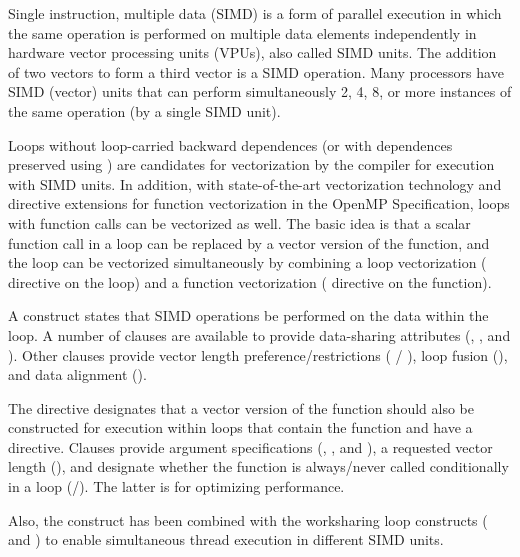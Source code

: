 \label{chap:simd}

Single instruction, multiple data (SIMD) is a form of parallel execution 
in which the same operation is performed on multiple data elements 
independently in hardware vector processing units (VPUs), also called SIMD units.
The addition of two vectors to form a third vector is a SIMD operation.
Many processors have SIMD (vector) units that can perform simultaneously 
2, 4, 8, or more instances of the same operation (by a single SIMD unit). 

Loops without loop-carried backward dependences (or with dependences preserved using
) are candidates for vectorization by the compiler for 
execution with SIMD units. In addition, with state-of-the-art vectorization 
technology and  directive extensions for function vectorization
in the OpenMP Specification, loops with function calls can be vectorized as well. 
The basic idea is that a scalar function call in a loop can be replaced by a vector version 
of the function, and the loop can be vectorized simultaneously by combining a loop 
vectorization ( directive on the loop) and a function 
vectorization ( directive on the function).

A  construct states that SIMD operations be performed on the
data within the loop. A number of clauses are available to provide
data-sharing attributes (, ,  and 
).  Other clauses provide vector length preference/restrictions 
( / ), loop fusion (), and data 
alignment ().

The  directive designates
that a vector version of the function should also be constructed for 
execution within loops that contain the function and have a  
directive.  Clauses provide argument specifications (,
, and ), a requested vector length 
(), and designate whether the function is always/never 
called conditionally in a loop (/). 
The latter is for optimizing performance.

Also, the  construct has been combined with the worksharing loop 
constructs ( and ) to enable simultaneous thread 
execution in different SIMD units.  






